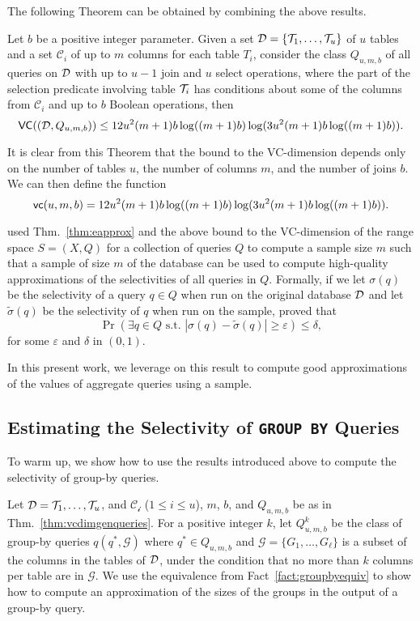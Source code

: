 The following Theorem can be obtained by combining the above results.

\begin{theorem}\label{thm:vcdimgenqueries}
Let $b$ be a positive integer parameter. Given a set
${\cal D}=\{{\cal T}_1,\dotsc,{\cal T}_u\}$ of $u$ tables and a set $\mathcal{C}_i$ of
up to $m$ columns for each table $T_i$, consider the class $Q_{u,m,b}$ of all
queries on ${\cal D}$ with up to $u-1$ join and $u$ select operations, where the
part of the selection predicate involving table ${\cal T}_i$ has conditions about
some of the columns from $\mathcal{C}_i$ and up to $b$ Boolean operations, then 
\[
\mathsf{VC}(({\cal D},Q_{u,m,b})) \leq 
12u^2(m+1)b\log((m+1)b)\log(3u^2(m+1)b\log((m+1)b)).\]
\end{theorem}
It is clear from this Theorem that the bound to the VC-dimension depends
only on the number of tables $u$, the number of columns $m$, and the number of
joins $b$. We can then define the function
\[
\mathsf{vc}(u,m,b)=12u^2(m+1)b\log((m+1)b)\log(3u^2(m+1)b\log((m+1)b)).\]

\citet{RiondatoACZU11} used Thm.~\ref{thm:eapprox} and the above bound to the
VC-dimension of the range space $S=(X,Q)$ for a collection of queries $Q$ to
compute a sample size $m$ such that a sample of size $m$ of the database can be
used to compute high-quality approximations of the selectivities of all queries
in $Q$. Formally, if we let $\sigma(q)$ be the selectivity of a query $q\in Q$
when run on the original database ${\cal D}$ and let $\tilde\sigma(q)$ be the
selectivity of $q$ when run on the sample, \citet{RiondatoACZU11} proved that
\[
\Pr\left(\exists q\in Q \mbox{ s.t.~}
|\sigma(q)-\tilde\sigma(q)|\ge\varepsilon\right)\le\delta,
\]
for some $\varepsilon$ and $\delta$ in $(0,1)$.


In this present work, we leverage on this result to compute good approximations
of the values of aggregate queries using a sample.

\subsection{Estimating the Selectivity of \texttt{GROUP BY} Queries}\label{sec:groupby}
To warm up, we show how to use the results introduced above to compute the
selectivity of group-by queries.

Let ${\cal D}={{\cal T}_1,\dots,{\cal T}_u}$, and $\mathcal{C_i}$ ($1\le i \le u$), $m$, $b$,
and $Q_{u,m,b}$ be as in Thm.~\ref{thm:vcdimgenqueries}. For a positive integer
$k$, let $Q^k_{u,m,b}$ be the class of group-by queries $q(q^*,\mathcal{G})$
where $q^*\in Q_{u,m,b}$ and $\mathcal{G}=\{G_1,\dots,G_\ell\}$ is a subset of
the columns in the tables of ${\cal D}$, under the condition that no more than $k$
columns per table are in $\mathcal{G}$. We use the equivalence from
Fact~\ref{fact:groupbyequiv} to show how to compute an approximation of the
sizes of the groups in the output of a group-by query. 

